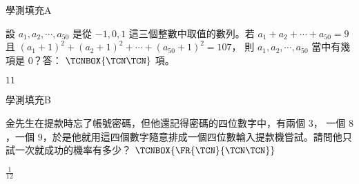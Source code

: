     \begin{QUESTION}
        \begin{ExamInfo}{92}{學測}{填充}{A}
        \end{ExamInfo}
        \begin{ExamAnsRateInfo}{37}{74}{31}{6}
        \end{ExamAnsRateInfo}
        \begin{QBODY}
            設 $a_1,a_2,\cdots,a_{50}$ 是從 $-1,0,1$ 這三個整數中取值的數列。若 $a_1 +a_2 + \cdots + a_{50} = 9$ 且 $(a_1+1)^2 +(a_2 +1)^2 + \cdots + (a_{50} +1)^2 =107$， 則 $a_1,a_2,\cdots,a_{50}$ 當中有幾項是 $0$？答： 
            $\TCNBOX{\TCN\TCN}$ 項。
        \end{QBODY}
        \begin{QFROMS}
        \end{QFROMS}
        \begin{QTAGS}\end{QTAGS}
        \begin{QANS}
            $11$
        \end{QANS}
        \begin{QSOLLIST}
        \end{QSOLLIST}
        \begin{QEMPTYSPACE}
        \end{QEMPTYSPACE}
    \end{QUESTION}
    \begin{QUESTION}
        \begin{ExamInfo}{92}{學測}{填充}{B}
        \end{ExamInfo}
        \begin{ExamAnsRateInfo}{64}{93}{70}{29}
        \end{ExamAnsRateInfo}
        \begin{QBODY}
            金先生在提款時忘了帳號密碼，但他還記得密碼的四位數字中，有兩個 $3$， 一個 $8$，一個 $9$，於是他就用這四個數字隨意排成一個四位數輸入提款機嘗試。請問他只試一次就成功的機率有多少？ $\TCNBOX{\FR{\TCN}{\TCN\TCN}}$
        \end{QBODY}
        \begin{QFROMS}
        \end{QFROMS}
        \begin{QTAGS}\end{QTAGS}
        \begin{QANS}
            $\frac{1}{12}$
        \end{QANS}
        \begin{QSOLLIST}
        \end{QSOLLIST}
        \begin{QEMPTYSPACE}
        \end{QEMPTYSPACE}
    \end{QUESTION}
